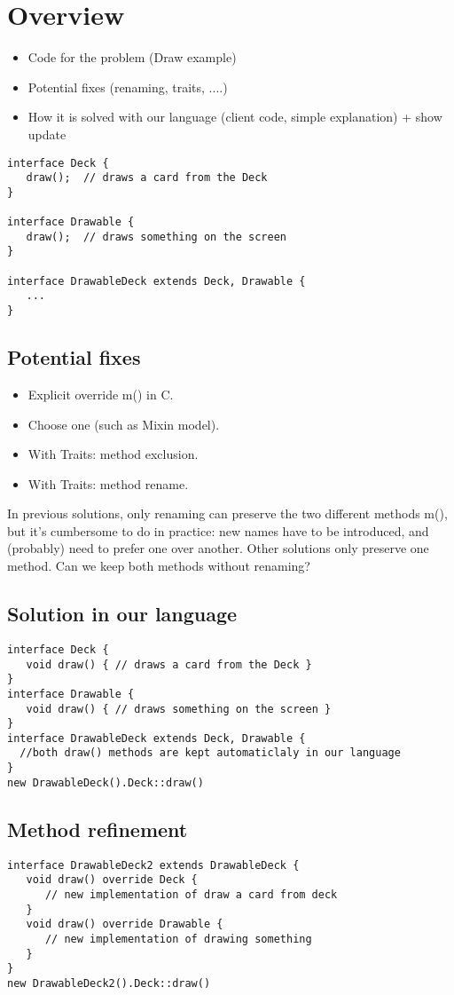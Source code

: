 \section{Overview}

\begin{itemize}
	\item Code for the problem (Draw example)
	\item Potential fixes (renaming, traits, ....)
	\item How it is solved with our language (client code, simple explanation) + show update
\end{itemize}

\begin{lstlisting}
interface Deck {
   draw();  // draws a card from the Deck
}

interface Drawable {
   draw();  // draws something on the screen
}

interface DrawableDeck extends Deck, Drawable {
   ...
} 
\end{lstlisting}

\subsection{Potential fixes}

\begin{itemize}
    \item Explicit override m() in C.
    \item Choose one (such as Mixin model).
    \item With Traits: method exclusion.
    \item With Traits: method rename.
\end{itemize}
In previous solutions, only renaming can preserve the two different methods m(), 
but it’s cumbersome to do in practice: new names have to be introduced, and (probably) need to prefer one over another. 
Other solutions only preserve one method. Can we keep both methods without renaming?

\subsection{Solution in our language}
\begin{lstlisting}
interface Deck {
   void draw() { // draws a card from the Deck }
}
interface Drawable {
   void draw() { // draws something on the screen }
}
interface DrawableDeck extends Deck, Drawable {
  //both draw() methods are kept automaticlaly in our language
} 
new DrawableDeck().Deck::draw()
\end{lstlisting}

\subsection{Method refinement}
\begin{lstlisting}
interface DrawableDeck2 extends DrawableDeck {
   void draw() override Deck {
      // new implementation of draw a card from deck
   }
   void draw() override Drawable {
      // new implementation of drawing something
   } 
} 
new DrawableDeck2().Deck::draw()
\end{lstlisting}
